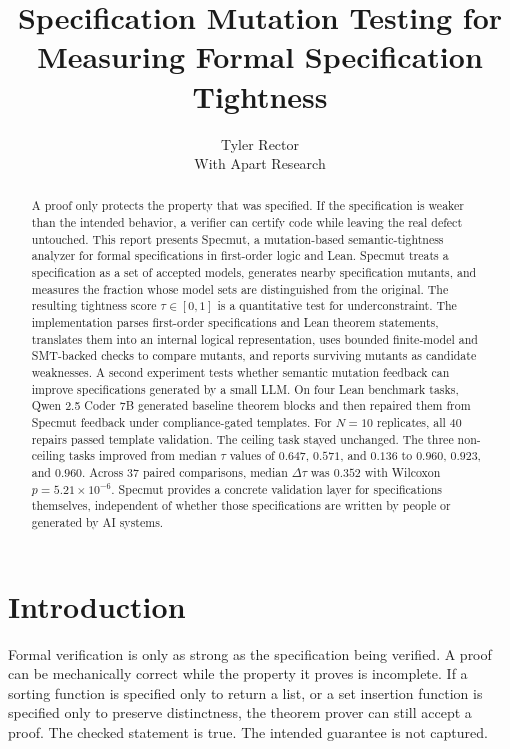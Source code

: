 \documentclass[11pt]{article}
\title{Specification Mutation Testing for Measuring Formal Specification Tightness}
\author{Tyler Rector\\With Apart Research}
\date{}
\begin{document}
\maketitle

\begin{abstract}
A proof only protects the property that was specified. If the specification is weaker than the intended behavior, a verifier can certify code while leaving the real defect untouched. This report presents Specmut, a mutation-based semantic-tightness analyzer for formal specifications in first-order logic and Lean. Specmut treats a specification as a set of accepted models, generates nearby specification mutants, and measures the fraction whose model sets are distinguished from the original. The resulting tightness score $\tau\in[0,1]$ is a quantitative test for underconstraint. The implementation parses first-order specifications and Lean theorem statements, translates them into an internal logical representation, uses bounded finite-model and SMT-backed checks to compare mutants, and reports surviving mutants as candidate weaknesses. A second experiment tests whether semantic mutation feedback can improve specifications generated by a small LLM. On four Lean benchmark tasks, Qwen 2.5 Coder 7B generated baseline theorem blocks and then repaired them from Specmut feedback under compliance-gated templates. For $N=10$ replicates, all 40 repairs passed template validation. The ceiling task stayed unchanged. The three non-ceiling tasks improved from median $\tau$ values of $0.647$, $0.571$, and $0.136$ to $0.960$, $0.923$, and $0.960$. Across 37 paired comparisons, median $\Delta\tau$ was $0.352$ with Wilcoxon $p=5.21\times10^{-6}$. Specmut provides a concrete validation layer for specifications themselves, independent of whether those specifications are written by people or generated by AI systems.
\end{abstract}

\section{Introduction}

Formal verification is only as strong as the specification being verified. A proof can be mechanically correct while the property it proves is incomplete. If a sorting function is specified only to return a list, or a set insertion function is specified only to preserve distinctness, the theorem prover can still accept a proof. The checked statement is true. The intended guarantee is not captured.
\end{document}
